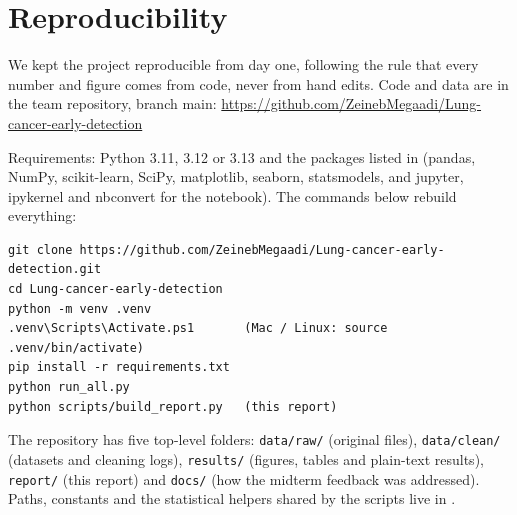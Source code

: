 \section{Reproducibility}\label{app:repro}

We kept the project reproducible from day one, following the rule that every number and figure comes from code, never from hand edits. Code and data are in the team repository, branch main: \url{https://github.com/ZeinebMegaadi/Lung-cancer-early-detection}

Requirements: Python 3.11, 3.12 or 3.13 and the packages listed in  (pandas, NumPy, scikit-learn, SciPy, matplotlib, seaborn, statsmodels, and jupyter, ipykernel and nbconvert for the notebook). The commands below rebuild everything:

\begin{verbatim}
git clone https://github.com/ZeinebMegaadi/Lung-cancer-early-detection.git
cd Lung-cancer-early-detection
python -m venv .venv
.venv\Scripts\Activate.ps1       (Mac / Linux: source .venv/bin/activate)
pip install -r requirements.txt
python run_all.py
python scripts/build_report.py   (this report)
\end{verbatim}

The repository has five top-level folders: \texttt{data/raw/} (original files), \texttt{data/clean/} (datasets and cleaning logs), \texttt{results/} (figures, tables and plain-text results), \texttt{report/} (this report) and \texttt{docs/} (how the midterm feedback was addressed). Paths, constants and the statistical helpers shared by the scripts live in .

